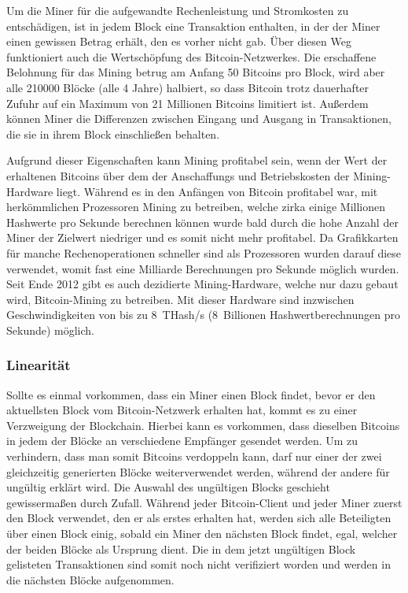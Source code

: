 Um die Miner für die aufgewandte Rechenleistung und Stromkosten zu entschädigen, ist in jedem Block eine Transaktion enthalten, in der der Miner einen gewissen Betrag erhält, den es vorher nicht gab.
Über diesen Weg funktioniert auch die Wertschöpfung des Bitcoin-Netzwerkes.
Die erschaffene Belohnung für das Mining betrug am Anfang 50 Bitcoins pro Block, wird aber alle 210000 Blöcke (alle 4 Jahre) halbiert, so dass Bitcoin trotz dauerhafter Zufuhr auf ein Maximum von 21 Millionen Bitcoins limitiert ist.
Außerdem können Miner die Differenzen zwischen Eingang und Ausgang in Transaktionen, die sie in ihrem Block einschließen behalten.

Aufgrund dieser Eigenschaften kann Mining profitabel sein, wenn der Wert der erhaltenen Bitcoins über dem der Anschaffungs und Betriebskosten der Mining-Hardware liegt.
Während es in den Anfängen von Bitcoin profitabel war, mit herkömmlichen Prozessoren Mining zu betreiben, welche zirka einige Millionen Hashwerte pro Sekunde berechnen können wurde bald durch die hohe Anzahl der Miner der Zielwert niedriger und es somit nicht mehr profitabel.
Da Grafikkarten für manche Rechenoperationen schneller sind als Prozessoren wurden darauf diese verwendet, womit fast eine Milliarde Berechnungen pro Sekunde möglich wurden.
Seit Ende 2012 gibt es auch dezidierte Mining-Hardware, welche nur dazu gebaut wird, Bitcoin-Mining zu betreiben.
Mit dieser Hardware sind inzwischen Geschwindigkeiten von bis zu 8~THash/s (8~Billionen Hashwertberechnungen pro Sekunde) möglich.

\subsubsection{Linearität}

Sollte es einmal vorkommen, dass ein Miner einen Block findet, bevor er den aktuellsten Block vom Bitcoin-Netzwerk erhalten hat, kommt es zu einer Verzweigung der Blockchain.
Hierbei kann es vorkommen, dass dieselben Bitcoins in jedem der Blöcke an verschiedene Empfänger gesendet werden.
Um zu verhindern, dass man somit Bitcoins verdoppeln kann, darf nur einer der zwei gleichzeitig generierten Blöcke weiterverwendet werden, während der andere für ungültig erklärt wird.
Die Auswahl des ungültigen Blocks geschieht gewissermaßen durch Zufall.
Während jeder Bitcoin-Client und jeder Miner zuerst den Block verwendet, den er als erstes erhalten hat, werden sich alle Beteiligten über einen Block einig, sobald ein Miner den nächsten Block findet, egal, welcher der beiden Blöcke als Ursprung dient.
Die in dem jetzt ungültigen Block gelisteten Transaktionen sind somit noch nicht verifiziert worden und werden in die nächsten Blöcke aufgenommen.
